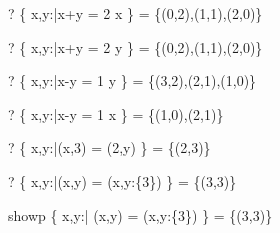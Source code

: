 \begin{zed}
  \vdash? \{ x,y:\nat|x+y = 2 \land x  \} = \{(0,2),(1,1),(2,0)\}
\end{zed}
\begin{zed}
  \vdash? \{ x,y:\nat|x+y = 2 \land y  \} = \{(0,2),(1,1),(2,0)\}
\end{zed}
\begin{zed}
  \vdash? \{ x,y:\nat|x-y = 1  \geq y \} = \{(3,2),(2,1),(1,0)\}
\end{zed}
\begin{zed}
  \vdash? \{ x,y:\nat|x-y = 1  \geq x \} = \{(1,0),(2,1)\}
\end{zed}
\begin{zed}
  \vdash? \{ x,y:\nat|(x,3) = (2,y) \} = \{(2,3)\}
\end{zed}
\begin{zed}
  \vdash? \{ x,y:\nat|(x,y) = (\mu x,y:\{3\}) \} = \{(3,3)\}
\end{zed}


showp \{ x,y:\nat | (x,y) = (\mu x,y:\{3\}) \} = \{(3,3)\}


